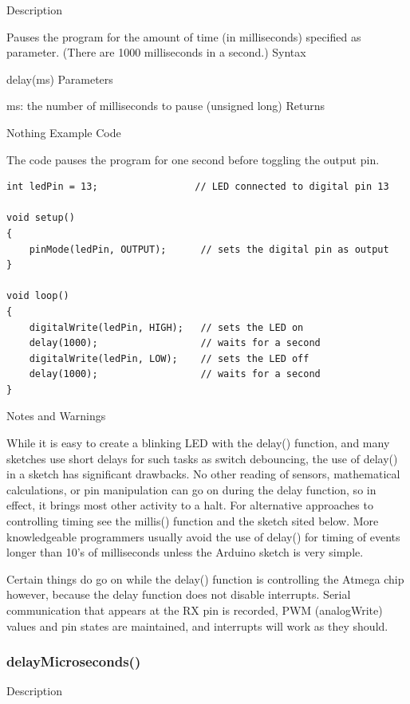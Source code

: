 \documentclass[12pt,a4paper]{report}  %
\begin{document}
Description

Pauses the program for the amount of time (in milliseconds) specified as parameter. (There are 1000 milliseconds in a second.)
Syntax

delay(ms)
Parameters

ms: the number of milliseconds to pause (unsigned long)
Returns

Nothing
Example Code

The code pauses the program for one second before toggling the output pin.

\begin{lstlisting}[label=digitalwrite,caption=delay]
int ledPin = 13;                 // LED connected to digital pin 13

void setup()
{
	pinMode(ledPin, OUTPUT);      // sets the digital pin as output
}

void loop()
{
	digitalWrite(ledPin, HIGH);   // sets the LED on
	delay(1000);                  // waits for a second
	digitalWrite(ledPin, LOW);    // sets the LED off
	delay(1000);                  // waits for a second
}
\end{lstlisting}

Notes and Warnings

While it is easy to create a blinking LED with the delay() function, and many sketches use short delays for such tasks as switch debouncing, the use of delay() in a sketch has significant drawbacks. No other reading of sensors, mathematical calculations, or pin manipulation can go on during the delay function, so in effect, it brings most other activity to a halt. For alternative approaches to controlling timing see the millis() function and the sketch sited below. More knowledgeable programmers usually avoid the use of delay() for timing of events longer than 10’s of milliseconds unless the Arduino sketch is very simple.

Certain things do go on while the delay() function is controlling the Atmega chip however, because the delay function does not disable interrupts. Serial communication that appears at the RX pin is recorded, PWM (analogWrite) values and pin states are maintained, and interrupts will work as they should.


\subsubsection{delayMicroseconds()}\label{delayMicroseconds}

Description
\end{document}
